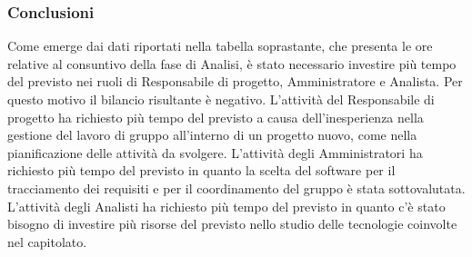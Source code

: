 \subsubsection{Conclusioni}
Come emerge dai dati riportati nella tabella soprastante, che presenta le ore relative al consuntivo della fase di Analisi, è stato necessario investire più tempo del previsto nei ruoli di Responsabile di progetto, Amministratore e Analista. Per questo motivo il bilancio risultante è negativo. L'attività del Responsabile di progetto ha richiesto più tempo del previsto a causa dell'inesperienza nella gestione del lavoro di gruppo all'interno di un progetto  nuovo, come nella pianificazione delle attività da svolgere. L'attività degli Amministratori ha richiesto più tempo del previsto in quanto la scelta del software per il tracciamento dei requisiti e per il coordinamento del gruppo è stata sottovalutata. L'attività degli Analisti ha richiesto più tempo del previsto in quanto c'è stato bisogno di investire più risorse del previsto nello studio delle tecnologie coinvolte nel capitolato. 